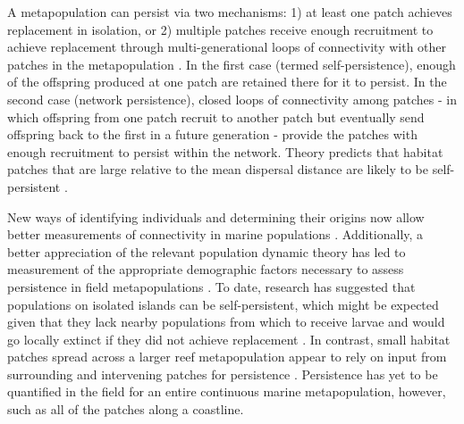 \documentclass[12pt, oneside]{article}   	%
\begin{document}
A metapopulation can persist via two mechanisms: 1) at least one patch achieves replacement in isolation, or 2) multiple patches receive enough recruitment to achieve replacement through multi-generational loops of connectivity with other patches in the metapopulation \citep{hastings_persistence_2006, burgess2014beyond}. In the first case (termed self-persistence), enough of the offspring produced at one patch are retained there for it to persist. In the second case (network persistence), closed loops of connectivity among  patches - in which offspring from one patch recruit to another patch but eventually send offspring back to the first in a future generation - provide the patches with enough recruitment to persist within the network. Theory predicts that habitat patches that are large relative to the mean dispersal distance are likely to be self-persistent \citep{white_population_2010}. %

New ways of identifying individuals and determining their origins now allow better measurements of connectivity in marine populations \citep{almany2017larval, daloia_self-recruitment_2013}. Additionally, a better appreciation of the relevant population dynamic theory has led to measurement of the appropriate demographic factors necessary to assess persistence in field metapopulations \citep{carson2011evaluating, hameed2016inverse, johnson2018integrating, salles_coral_2015}. To date, research has suggested that populations on isolated islands can be self-persistent, which might be expected given that they lack nearby populations from which to receive larvae and would go locally extinct if they did not achieve replacement \citep{salles_coral_2015}. In contrast, small habitat patches spread across a larger reef metapopulation appear to rely on input from surrounding and intervening patches for persistence \citep{johnson2018integrating}. Persistence has yet to be quantified in the field for an entire continuous marine metapopulation, however, such as all of the patches along a coastline. 

\end{document}

